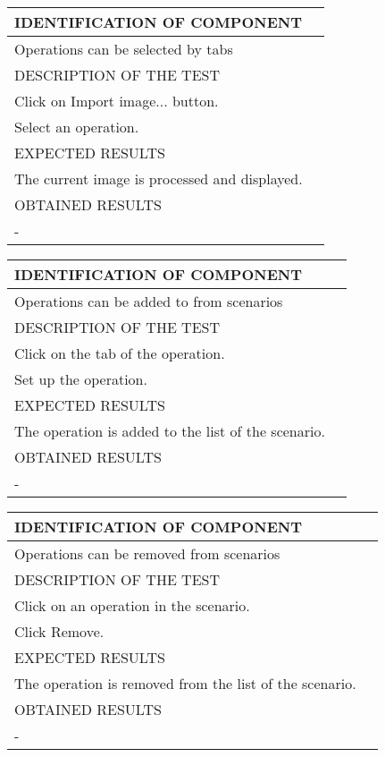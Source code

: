 \documentclass{polytech/polytech}
\numberwithin{figure}{chapter}
\begin{document}
\begin{appendix}
\begin{table}[]
\begin{tabular}{|l|l|}\hline
\color{C} IDENTIFICATION OF COMPONENT \\\hline
Operations can be selected by tabs  \\\hline
\color{C} DESCRIPTION OF THE TEST\\\hline
Click on Import image... button.\\ Select an operation. \\\hline
\color{C} EXPECTED RESULTS \\\hline
The current image is processed and displayed. \\\hline
\color{C} OBTAINED RESULTS \\\hline
- \\\hline
\end{tabular}
\end{table}

\begin{table}[]
\begin{tabular}{|l|l|}\hline
\color{C} IDENTIFICATION OF COMPONENT \\\hline
Operations can be added to from scenarios  \\\hline
\color{C} DESCRIPTION OF THE TEST\\\hline
Click on the tab of the operation.\\ Set up the operation. \\\hline
\color{C} EXPECTED RESULTS \\\hline
The operation is added to the list of the scenario. \\\hline
\color{C} OBTAINED RESULTS \\\hline
- \\\hline
\end{tabular}
\end{table}

\begin{table}[]
\begin{tabular}{|l|l|}\hline
\color{C} IDENTIFICATION OF COMPONENT \\\hline
Operations can be removed from scenarios  \\\hline
\color{C} DESCRIPTION OF THE TEST\\\hline
Click on an operation in the scenario.\\ Click Remove. \\\hline
\color{C} EXPECTED RESULTS \\\hline
The operation is removed from the list of the scenario. \\\hline
\color{C} OBTAINED RESULTS \\\hline
- \\\hline
\end{tabular}
\end{table}


\end{appendix}
\end{document}
